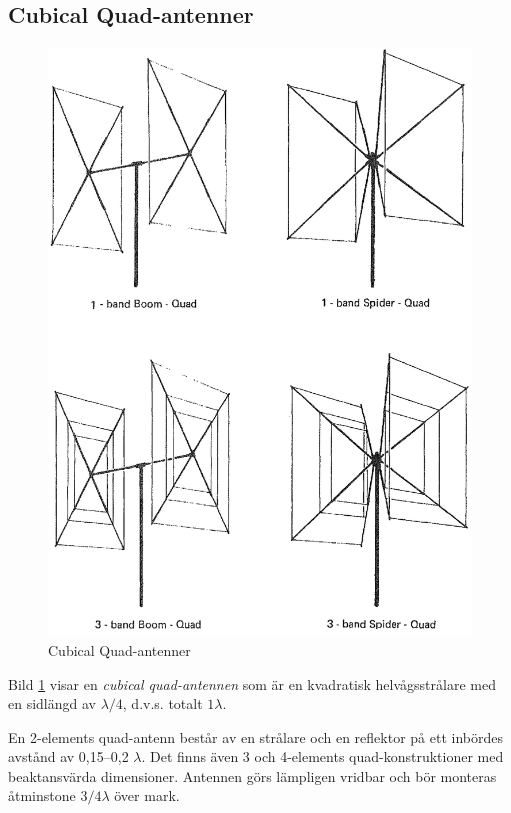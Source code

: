 \subsection{Cubical Quad-antenner}

\begin{figure}
  \includegraphics[width=\textwidth]{images/cropped_pdfs/bild_2_6-19.pdf}
  \caption{Cubical Quad-antenner}
  \label{fig:bildII6-19}
\end{figure}

Bild \ref{fig:bildII6-19} visar en \emph{cubical quad-antennen} som är en
kvadratisk helvågsstrålare med en sidlängd av \(\lambda/4\), d.v.s. totalt
\(1\lambda\).

En 2-elements quad-antenn består av en strålare och en reflektor på
ett inbördes avstånd av 0,15--0,2 \(\lambda\).
Det finns även 3 och 4-elements quad-konstruktioner med beaktansvärda
dimensioner.
Antennen görs lämpligen vridbar och bör monteras åtminstone \(3/4 \lambda\)
över mark.

